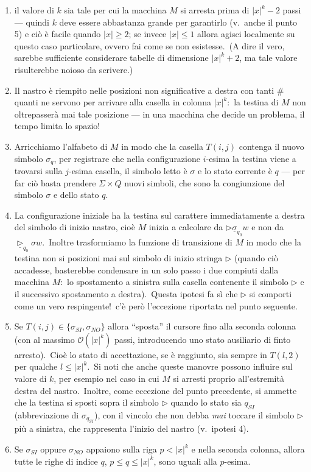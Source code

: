 \begin{enumerate}
    \item il valore di $k$ sia tale per cui la macchina $M$ si arresta prima di $|x|^k -2$ passi --- quindi $k$ deve essere abbastanza grande per garantirlo (v.\ anche il punto 5) e ciò è facile quando $|x| \geq 2$; se invece $|x| \leq 1$ allora agisci localmente su questo caso particolare, ovvero fai come se non esistesse.\
          (A dire il vero, sarebbe sufficiente considerare tabelle di dimensione $|x|^k + 2$, ma tale valore risulterebbe noioso da scrivere.)
    \item  Il nastro è riempito nelle posizioni non significative a destra con tanti \# quanti ne servono per arrivare alla casella in colonna $|x|^k$:\ la testina di $M$ non oltrepasserà mai tale posizione --- in una macchina che decide un problema, il tempo limita lo spazio!
    \item Arricchiamo l'alfabeto di $M$ in modo che la casella $T(i, j)$ contenga il nuovo simbolo $\sigma_q$, per registrare che nella configurazione $i$-esima la testina viene a trovarsi sulla $j$-esima casella, il simbolo letto è $\sigma$ e lo stato corrente è $q$ --- per far ciò basta prendere $\Sigma \times Q$ nuovi simboli, che sono la congiunzione del simbolo $\sigma$ e dello stato $q$.
    \item La configurazione iniziale ha la testina sul carattere immediatamente a destra del simbolo di inizio nastro, cioè $M$ inizia a calcolare da $\triangleright \underline{\sigma}_{q_0}w$ e non da $\underline{\triangleright}_{q_0}\sigma w$.\
          Inoltre trasformiamo la funzione di transizione di $M$ in modo che la testina non si posizioni mai sul simbolo di inizio stringa $\triangleright$ (quando ciò accadesse, basterebbe condensare in un solo passo i due compiuti dalla macchina $M$:\ lo spostamento a sinistra sulla casella contenente il simbolo $\triangleright$ e il successivo spostamento a destra).\
          Questa ipotesi fa sì che $\triangleright$ si comporti come un vero respingente!\ c'è però l'eccezione riportata nel punto seguente.
    \item Se $T(i, j) \in \{\sigma_{SI}, \sigma_{NO}\}$ allora ``sposta'' il cursore fino alla seconda colonna (con al massimo $\mathcal{O}\left(|x|^k\right)$ passi, introducendo uno stato ausiliario di finto arresto).\
          Cioè lo stato di accettazione, se è raggiunto, sia sempre in $T(l, 2)$ per qualche $l \leq |x|^k$.\
          Si noti che anche queste manovre possono influire sul valore di $k$, per esempio nel caso in cui $M$ si arresti proprio all'estremità destra del nastro.\
          Inoltre, come eccezione del punto precedente, si ammette che la testina si sposti sopra il simbolo $\triangleright$ quando lo stato sia $q_{SI}$ (abbreviazione di $\sigma_{q_{SI}}$), con il vincolo che non debba \textit{mai} toccare il simbolo $\triangleright$ più a sinistra, che rappresenta l'inizio del nastro (v.\ ipotesi 4).
    \item Se $\sigma_{SI}$ oppure $\sigma_{NO}$ appaiono sulla riga $p < |x|^k$ e nella seconda colonna, allora tutte le righe di indice $q$, $p \leq q \leq |x|^k$, sono uguali alla $p$-esima.
\end{enumerate}

